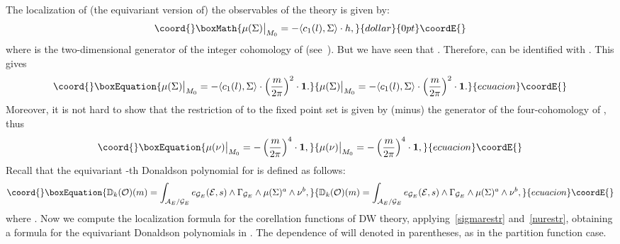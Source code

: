 \documentclass[a4paper,12pt,reqno,sumlimits]{amsart}
\theoremstyle{plain}
\theoremstyle{definition}
\providecommand{\C}{{\mathbb C}}
\providecommand{\D}{{\mathbb D}}
\providecommand{\1}{{\bf 1}}
\providecommand{\calA}{{\mathcal A}}
\providecommand{\calE}{{\mathcal E}}
\providecommand{\calG}{{\mathcal G}}
\providecommand{\calO}{{\mathcal O}}
\providecommand{\ip}[1]{\langle #1 \rangle}
\numberwithin{equation}{section}
\begin{document}
The localization of (the equivariant version of) the observables of the
theory is given by:
$$\coord{}\boxMath{
\mu(\Sigma)\big|_{M_0}=-\ip{c_1(l),\Sigma}\cdot h,
}{dollar}{0pt}\coordE{}$$
where \coordHE{} is the two-dimensional generator of the integer cohomology of
\coordHE{} (see~\cite[p. 187]{dk}). But we have seen that \myHighlight{$H^*(BS^1)\cong
H^*_{S^1}(pt)=\C[m]$}\coordHE{}.  Therefore, \coordHE{} can be identified with
\myHighlight{$\displaystyle\left(\frac{m}{2\pi}\right)^2\cdot\1$}\coordHE{}. This gives
\begin{equation}\coord{}\boxEquation{
  \label{sigmarestr}
  \mu(\Sigma)\big|_{M_0}=-\ip{c_1(l),\Sigma}\cdot\left(\frac{m}{2\pi}\right)^2\cdot\1.
}{
  \mu(\Sigma)\big|_{M_0}=-\ip{c_1(l),\Sigma}\cdot\left(\frac{m}{2\pi}\right)^2\cdot\1.
}{ecuacion}\coordE{}\end{equation}
Moreover, it is not hard to show that the restriction of \myHighlight{$\mu(\nu)$}\coordHE{} to the
fixed point set is given by (minus) the generator of the four-cohomology of
\coordHE{}, thus
\begin{equation}\coord{}\boxEquation{
  \label{nurestr}
  \mu(\nu)\big|_{M_0}=-\left(\frac{m}{2\pi}\right)^4\cdot\1,
}{
  \mu(\nu)\big|_{M_0}=-\left(\frac{m}{2\pi}\right)^4\cdot\1,
}{ecuacion}\coordE{}\end{equation}
Recall that the equivariant \coordHE{}-th Donaldson polynomial for
\myHighlight{$\calO=\Sigma^a\wedge\nu^b$}\coordHE{} is defined as follows:
\begin{equation}\coord{}\boxEquation{
  \D_k(\calO)(m)=\int_{{\calA}_E/{\calG}_E}
  e_{\calG_E}(\calE,s)\wedge\Gamma_{\calG_E}
  \wedge\mu(\Sigma)^a\wedge\nu^b,
}{
  \D_k(\calO)(m)=\int_{{\calA}_E/{\calG}_E}
  e_{\calG_E}(\calE,s)\wedge\Gamma_{\calG_E}
  \wedge\mu(\Sigma)^a\wedge\nu^b,
}{ecuacion}\coordE{}\end{equation}
where \coordHE{}. Now we compute the localization formula for the
corellation functions of DW theory, applying~\eqref{sigmarestr}
and~\eqref{nurestr}, obtaining a formula for the equivariant Donaldson
polynomials in \myHighlight{$\C[m]$}\coordHE{}.  The dependence of \coordHE{} will denoted in parentheses,
as in the partition function case.
\end{document}
